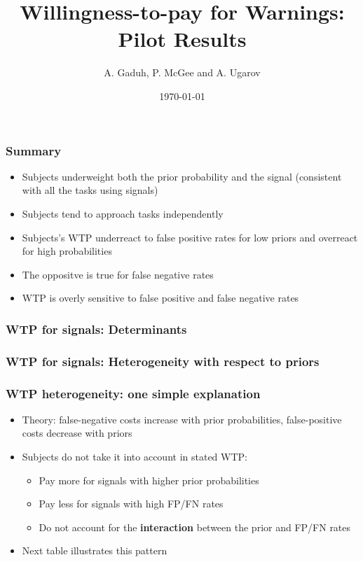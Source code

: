 \documentclass[11pt,hyperref={bookmarks=false}]{beamer}
\title[Willingness-to-pay for Warnings]{Willingness-to-pay for Warnings: Pilot Results}
\author[A. Gaduh, P. McGee and A. Ugarov]{A. Gaduh, P. McGee and A. Ugarov}
\institute[]{}
\date{\today}
\newcommand\BackgroundPic{%
\put(0,0){%
\parbox[b][\paperheight]{\paperwidth}{%
\vfill
\centering
\vfill
}}}
\begin{document}

\begin{frame}
\titlepage
\end{frame}


\begin{frame}
\frametitle{Summary}
\begin{itemize}
\item Subjects underweight both the prior probability and the signal (consistent with all the tasks using signals)
\item Subjects tend to approach tasks independently
\item Subjects's WTP underreact to false positive rates for low priors and overreact for high probabilities
\item The oppositve is true for false negative rates


\item WTP is overly sensitive to false positive and false negative rates
\end{itemize}
\end{frame}

\begin{frame}
\frametitle{WTP for signals: Determinants}
\footnotesize


\end{frame}

\begin{frame}
\frametitle{WTP for signals: Heterogeneity with respect to priors}
\footnotesize

\end{frame}


\begin{frame}
\frametitle{WTP heterogeneity: one simple explanation}
\begin{itemize}
\item Theory: false-negative costs increase with prior probabilities, false-positive costs decrease with priors
\item Subjects do not take it into account in stated WTP:
\begin{itemize}
\item Pay more for signals with higher prior probabilities
\item Pay less for signals with high FP/FN rates
\item Do not account for the \textbf{interaction} between the prior and FP/FN rates
\end{itemize}
\item Next table illustrates this pattern
\end{itemize}
\end{frame}
\end{document}
